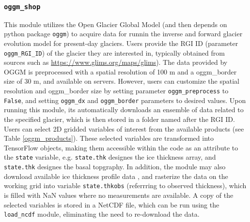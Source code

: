 \documentclass[10pt,twocolumn]{article}
\begin{document}
\subsubsection{\texttt{oggm\_shop}}
\label{module_oggm}

This module utilizes the Open Glacier Global Model \citep[OGGM][]{maussion2019open} 
(and then depends on python package \texttt{oggm}) to acquire data for runnin the inverse 
and forward glacier evolution model for present-day glaciers.
Users provide the RGI ID (parameter \texttt{oggm\_RGI\_ID})
of the glacier they are interested in, typically obtained from sources such as
\url{https://www.glims.org/maps/glims}).
The data provided by OGGM is preprocessed with a spatial resolution of 100 m and a 
oggm\_border size of 30 m, and available on servers. 
However, users can customize the spatial resolution and oggm\_border
size by setting parameter \texttt{oggm\_preprocess} to \texttt{False}, and setting \texttt{oggm\_dx} 
and \texttt{oggm\_border} parameters to desired values.
Upon running this module, its automatically downloads an ensemble of data related to the 
specified glacier, which is then stored in a folder named after the RGI ID. 
Users can select 2D gridded variables of interest from the available products 
(see Table \ref{oggm_products}). These selected variables are transformed into TensorFlow 
objects, making them accessible within the code as an attribute to the \texttt{state} variable, 
e.g. \texttt{state.thk} designes the ice thickness array, and \texttt{state.thk} designes the basal 
topgraphy. In addition, the module may also download available ice thickness profile data 
\citep{GlaThiDa}, and rasterize the data on the working grid into variable
\texttt{state.thkobs} (referrring to observed thickness), which is filled with NaN values
where no measurements are available.
A copy of the selected variables is stored in a NetCDF file, which can be
run using the \texttt{load\_ncdf} module, eliminating the need to re-download the data.
\end{document}

